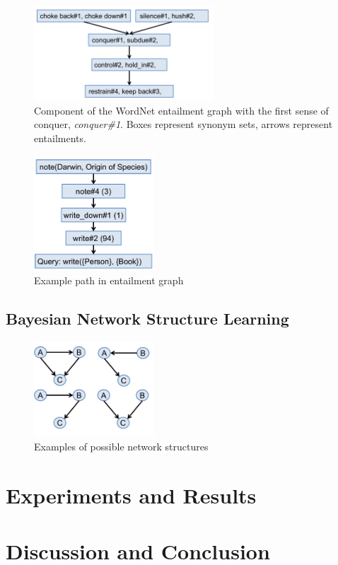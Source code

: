 \documentclass{article}
\begin{document}

\begin{figure}[h]
\begin{center}
\includegraphics[width=0.6\textwidth]{figures/wordnet-graph.pdf}
\end{center}
\caption{Component of the WordNet entailment graph with the first sense of conquer, \textit{conquer\#1}. Boxes represent synonym sets, arrows represent entailments.}\label{wordnet-graph}
\end{figure}


\begin{figure}[h]
\begin{center}
\includegraphics[width=0.4\textwidth]{figures/example-path.pdf}
\end{center}
\caption{Example path in entailment graph}\label{example-path}
\end{figure}


\subsection{Bayesian Network Structure Learning}

\begin{figure}[h]
\begin{center}
\includegraphics[width=0.4\textwidth]{figures/example-net-structures.pdf}
\end{center}
\caption{Examples of possible network structures}\label{example-net-structures}
\end{figure}


\section{Experiments and Results}

\section{Discussion and Conclusion}




\end{document}
